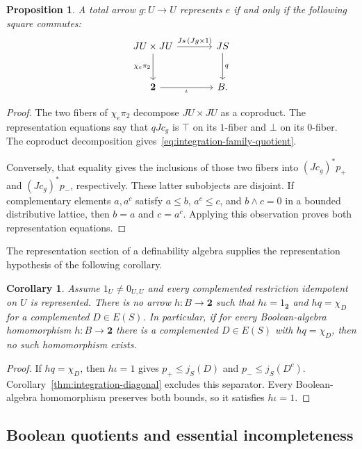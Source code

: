 \documentclass[11pt]{article}
\newtheorem{proposition}[theorem]{Proposition}
\newtheorem{corollary}[theorem]{Corollary}
\theoremstyle{definition}
\theoremstyle{remark}
\begin{document}
\begin{proposition}\label{prop:integration-family-equation}
A total arrow $g:U\to U$ represents $e$ if and only if the
following square commutes:
\begin{equation}\label{eq:integration-family-quotient}
\begin{tikzcd}[column sep=large,row sep=large]
 JU\times JU \arrow[r,"Js\,(Jg\times1)"] \arrow[d,"\chi_e\pi_2"'] & JS \arrow[d,"q"] \\
 \mathbf2 \arrow[r,"\iota"'] & B.
\end{tikzcd}
\end{equation}
\end{proposition}
\begin{proof}
The two fibers of $\chi_e\pi_2$ decompose $JU\times JU$ as a
coproduct. The representation equations say that $qJc_g$ is
$\top$ on its $1$-fiber and $\bot$ on its $0$-fiber. The
coproduct decomposition gives~\eqref{eq:integration-family-quotient}.

Conversely, that equality gives the inclusions of those two
fibers into $(Jc_g)^*p_+$ and $(Jc_g)^*p_-$, respectively.
These latter subobjects are disjoint. If complementary elements
$a,a^c$ satisfy $a\leq b$, $a^c\leq c$, and $b\wedge c=0$
in a bounded distributive lattice, then $b=a$ and $c=a^c$.
Applying this observation proves both representation equations.
\end{proof}

The representation section of a definability algebra supplies
the representation hypothesis of the following corollary.

\begin{corollary}\label{cor:integration-no-boolean-map}
Assume $1_U\ne0_{U,U}$ and every complemented restriction idempotent on $U$ is
represented. There is no arrow $h:B\to\mathbf2$ such that
$h\iota=1_{\mathbf2}$ and $hq=\chi_D$ for a complemented
$D\in E(S)$. In particular, if for every Boolean-algebra
homomorphism $h:B\to\mathbf2$ there is a complemented
$D\in E(S)$ with $hq=\chi_D$, then no such homomorphism exists.
\end{corollary}
\begin{proof}
If $hq=\chi_D$, then $h\iota=1$ gives
$p_+\leq j_S(D)$ and $p_-\leq j_S(D^c)$.
Corollary~\ref{thm:integration-diagonal} excludes this separator.
Every Boolean-algebra homomorphism preserves both bounds, so
it satisfies $h\iota=1$.
\end{proof}

\subsection{Boolean quotients and essential incompleteness}
\label{sec:boolean-extensions}
\end{document}
